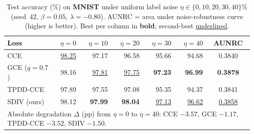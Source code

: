 
\begin{table}[t]
\centering
\caption{Test accuracy (\%) on \textbf{MNIST} under uniform label noise
$\eta \in \{0,10,20,30,40\}\%$ (seed~42, $\beta{=}0.05$, $\lambda{=}{-0.80}$).
AUNRC = area under noise-robustness curve (higher is better).
Best per column in \textbf{bold}; second-best \underline{underlined}.}
\label{tab:noise_mnist}
\small
\begin{tabular}{@{}lrrrrrc@{}}
\toprule
\textbf{Loss} & $\eta{=}0$ & $\eta{=}10$ & $\eta{=}20$ & $\eta{=}30$ & $\eta{=}40$ & \textbf{AUNRC} \\
\midrule
CCE              & \underline{98.25} & 97.17 & 96.58 & 95.66 & 94.68 & 0.3840 \\
GCE ($q{=}0.7$)  & 98.16 & \underline{97.81} & \underline{97.75} & \textbf{97.23} & \textbf{96.99} & \textbf{0.3878} \\
TPDD-CCE         & 97.89 & 97.55 & 97.08 & 95.35 & 94.37 & 0.3841 \\
SDIV (ours)      & 98.12 & \textbf{97.99} & \textbf{98.04} & \underline{97.13} & \underline{96.62} & \underline{0.3858} \\
\midrule
\multicolumn{7}{l}{\footnotesize Absolute degradation $\Delta$ (pp) from $\eta{=}0$ to $\eta{=}40$:
  CCE $-3.57$, GCE $-1.17$, TPDD-CCE $-3.52$, SDIV $-1.50$.} \\
\bottomrule
\end{tabular}
\end{table}
